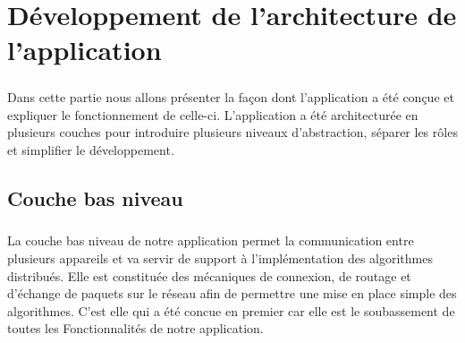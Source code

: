 \documentclass[a4paper,10pt]{report}
\begin{document}
    
\chapter{Développement de l'architecture de l'application}
  \paragraph{}
  Dans cette partie nous allons présenter la façon dont l'application a été conçue et expliquer le fonctionnement de celle-ci. L'application a été architecturée en plusieurs couches pour introduire plusieurs niveaux d'abstraction, séparer les rôles et simplifier le développement.
  
  \section{Couche bas niveau}
    \paragraph{}
    La couche bas niveau de notre application permet la communication entre plusieurs appareils et va servir de support à l'implémentation des algorithmes distribués. Elle est constituée des mécaniques de connexion, de routage et d'échange de paquets sur le réseau afin de permettre une mise en place simple des algorithmes. C'est elle qui a été concue en premier car elle est le soubassement de toutes les Fonctionnalités de notre application.
  
\end{document}
